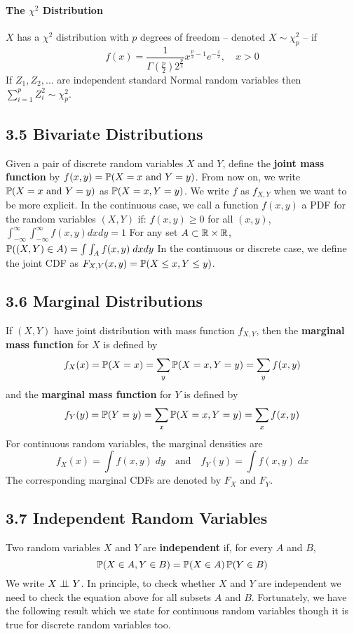 \paragraph{\texorpdfstring{The \(\chi^{2}\) Distribution}{The \textbackslash chi^{2} Distribution}}\label{chi2:dist}
\(X\) has a \(\chi^{2}\) distribution with \(p\) degrees of freedom -- denoted \(X \sim \chi_{p}^{2}\) -- if
\[
f(x) = \frac{1}{\Gamma\left(\frac{p}{2}\right) 2^{\frac{p}{2}}} x^{\frac{p}{2} - 1} e^{-\frac{x}{2}}, \quad x > 0 
\]
If \(Z_{1}, Z_{2}, \dots\) are independent standard Normal random variables then \(\sum_{i=1}^p Z_{i}^{2} \sim \chi_{p}^{2}\).

\subsection*{3.5 Bivariate Distributions}\label{bivariate-distributions}
Given a pair of discrete random variables \(X\) and \(Y\), define the \textbf{joint mass function} by \(f(x, y) = \operatorname{\mathbb{P}}(X = x \text{ and } Y = y)\). From now on, we write \(\operatorname{\mathbb{P}}(X = x \text{ and } Y = y)\) as \(\operatorname{\mathbb{P}}(X = x, Y = y)\). We write \(f\) as \(f_{X, Y}\) when we want to be more explicit.
In the continuous case, we call a function \(f(x, y)\) a PDF for the random variables \((X, Y)\) if:  \(f(x, y) \geq 0\) for all \((x, y)\), \( \int_{-\infty}^{\infty}\int_{-\infty}^{\infty} f(x, y) dx dy = 1\) 
For any set \(A \subset \mathbb{R} \times \mathbb{R}\), \(\operatorname{\mathbb{P}}((X, Y) \in A) = \int \int_A f(x, y) \; dx dy\)
In the continuous or discrete case, we define the joint CDF as 
\(F_{X, Y}(x, y) = \operatorname{\mathbb{P}}(X \leq x, Y \leq y)\).

\subsection*{3.6 Marginal Distributions}\label{marginal-distributions}
If \((X, Y)\) have joint distribution with mass function \(f_{X, Y}\), then the \textbf{marginal mass function} for \(X\) is defined by
\[
f_X(x) = \operatorname{\mathbb{P}}(X = x) = \sum_y \operatorname{\mathbb{P}}(X = x, Y = y) = \sum_y f(x, y)
\]
and the \textbf{marginal mass function} for \(Y\) is defined by
\[
f_Y(y) = \operatorname{\mathbb{P}}(Y = y) = \sum_x \operatorname{\mathbb{P}}(X = x, Y = y) = \sum_x f(x, y) 
\]
For continuous random variables, the marginal densities are
\[
f_X(x) = \int f(x, y) \; dy \quad \text{and} \quad f_Y(y) = \int f(x, y) \; dx 
\]
The corresponding marginal CDFs are denoted by \(F_X\) and \(F_Y\).

\subsection*{3.7 Independent Random Variables}\label{independent-random-variables}
Two random variables \(X\) and \(Y\) are \textbf{independent} if, for every \(A\) and \(B\),
\[
\operatorname{\mathbb{P}}(X \in A, Y \in B) = \operatorname{\mathbb{P}}(X \in A) \operatorname{\mathbb{P}}(Y \in B)
\]
We write \(X \perp\!\!\!\perp Y\).
In principle, to check whether \(X\) and \(Y\) are independent we need to check the equation above for all subsets \(A\) and \(B\). Fortunately, we have the following result which we state for continuous random variables though it is true for discrete random variables too.

